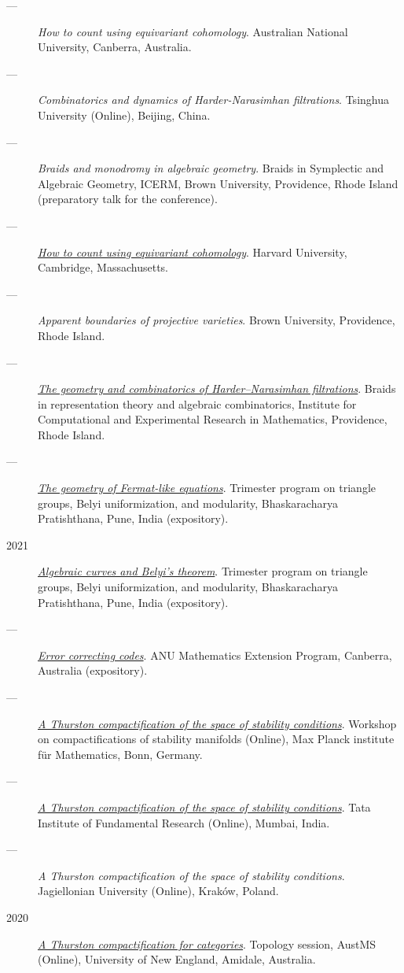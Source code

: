 \documentclass[11pt]{article}
\begin{document}
\begin{description}
\item[{---}] \emph{How to count using equivariant cohomology}. Australian National University, Canberra, Australia.
\item[{---}] \emph{Combinatorics and dynamics of Harder-Narasimhan filtrations}. Tsinghua University (Online), Beijing, China.
\item[{---}] \emph{Braids and monodromy in algebraic geometry}. Braids in Symplectic and Algebraic Geometry, ICERM, Brown University, Providence, Rhode Island (preparatory talk for the conference).
\item[{---}] \emph{\href{talks/Harvard2022.pdf}{How to count using equivariant cohomology}}. Harvard University, Cambridge, Massachusetts.
\item[{---}] \emph{Apparent boundaries of projective varieties}. Brown University, Providence, Rhode Island.
\item[{---}] \emph{\href{talks/ICERM2022.pdf}{The geometry and combinatorics of Harder--Narasimhan filtrations}}. Braids in representation theory and algebraic combinatorics, Institute for Computational and Experimental Research in Mathematics, Providence, Rhode Island.
\item[{---}] \emph{\href{talks/Fermat2022.pdf}{The geometry of Fermat-like equations}}. Trimester program on triangle groups, Belyi uniformization, and modularity, Bhaskaracharya Pratishthana, Pune, India (expository).
\item[{2021}] \emph{\href{talks/Belyi2021.pdf}{Algebraic curves and Belyi's theorem}}. Trimester program on triangle groups, Belyi uniformization, and modularity, Bhaskaracharya Pratishthana, Pune, India (expository).
\item[{---}] \emph{\href{talks/ecc2021/ecc.html}{Error correcting codes}}. ANU Mathematics Extension Program, Canberra, Australia (expository).
\item[{---}] \emph{\href{talks/Bonn2021.pdf}{A Thurston compactification of the space of stability conditions}}. Workshop on compactifications of stability manifolds (Online), Max Planck institute für Mathematics, Bonn, Germany.
\item[{---}] \emph{\href{talks/tifr2021.pdf}{A Thurston compactification of the space of stability conditions}}. Tata Institute of Fundamental Research (Online), Mumbai, India.
\item[{---}] \emph{A Thurston compactification of the space of stability conditions}. Jagiellonian University (Online), Kraków, Poland.
\item[{2020}] \emph{\href{talks/AustMS2020.pdf}{A Thurston compactification for categories}}. Topology session, AustMS (Online), University of New England, Amidale, Australia.

\end{description}
\end{document}
